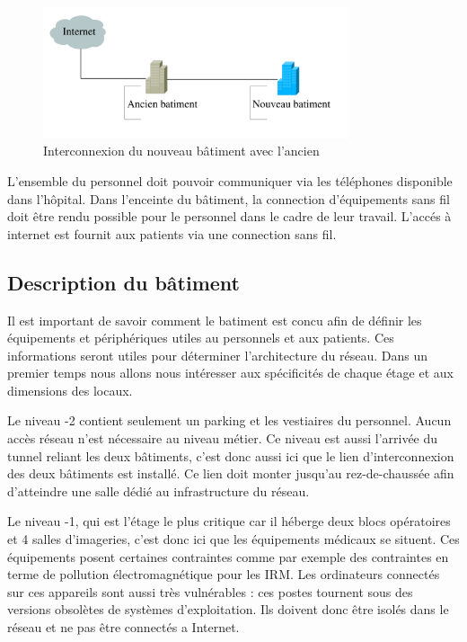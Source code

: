%

\begin{figure}[!ht]
    \center
    \includegraphics[width=0.8\textwidth]{./images/interco-batiment.png}
    \caption{Interconnexion du nouveau bâtiment avec l'ancien}
\end{figure}

%

L'ensemble du personnel doit pouvoir communiquer via les téléphones disponible dans l'hôpital.
Dans l'enceinte du bâtiment, la connection d'équipements sans fil doit être rendu possible pour le personnel dans le cadre de leur travail.
L'accés à internet est fournit aux patients via une connection sans fil.


%
%
\subsection{Description du bâtiment}

Il est important de savoir comment le batiment est concu afin de définir les équipements et périphériques utiles au personnels et aux patients.
Ces informations seront utiles pour déterminer l'architecture du réseau.
Dans un premier temps nous allons nous intéresser aux spécificités de chaque étage et aux dimensions des locaux.

%

Le niveau -2 contient seulement un parking et les vestiaires du personnel.
Aucun accès réseau n'est nécessaire au niveau métier.
Ce niveau est aussi l'arrivée du tunnel reliant les deux bâtiments, c'est donc aussi ici que le lien d'interconnexion des deux bâtiments est installé.
Ce lien doit monter jusqu'au rez-de-chaussée afin d'atteindre une salle dédié au infrastructure du réseau.

%

Le niveau -1, qui est l'étage le plus critique car il héberge deux blocs opératoires et 4 salles d'imageries, c'est donc ici que les équipements médicaux se situent.
Ces équipements posent certaines contraintes comme par exemple des contraintes en terme de pollution électromagnétique pour les IRM.
Les ordinateurs connectés sur ces appareils sont aussi très vulnérables : ces postes tournent sous des versions obsolètes de systèmes d'exploitation.
Ils doivent donc être isolés dans le réseau et ne pas être connectés a Internet.

